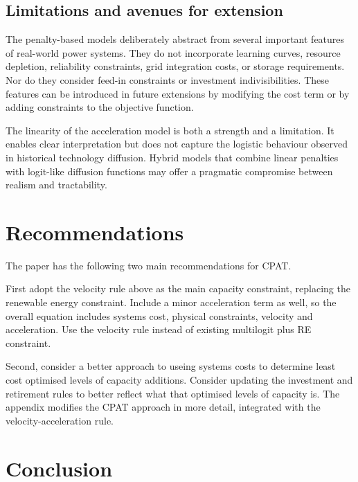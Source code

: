 \documentclass[preprint,authoryear,12pt]{elsarticle}
\begin{document}
\subsection{Limitations and avenues for extension}

The penalty-based models deliberately abstract from several important features of real-world
power systems. They do not incorporate learning curves, resource depletion, reliability
constraints, grid integration costs, or storage requirements. Nor do they consider feed-in
constraints or investment indivisibilities. These features can be introduced in future extensions by
modifying the cost term or by adding constraints to the objective function.

The linearity of the acceleration model is both a strength and a limitation. It enables clear
interpretation but does not capture the logistic behaviour observed in historical technology
diffusion. Hybrid models that combine linear penalties with logit-like diffusion functions may
offer a pragmatic compromise between realism and tractability.

\newpage
\newpage

\section{Recommendations}

The paper has the following two main recommendations for CPAT.

First adopt the velocity rule above as the main capacity constraint, replacing the renewable energy constraint. Include a minor acceleration term as well, so the overall equation includes systems cost, physical constraints, velocity and acceleration. Use the velocity rule instead of existing multilogit plus RE constraint.

Second, consider a better approach to useing systems costs to determine least cost optimised levels of capacity additions. Consider updating the investment and retirement rules to better reflect what that optimised levels of capacity is. The appendix modifies the CPAT approach in more detail, integrated with the velocity-acceleration rule.


\section{Conclusion}
\end{document}
